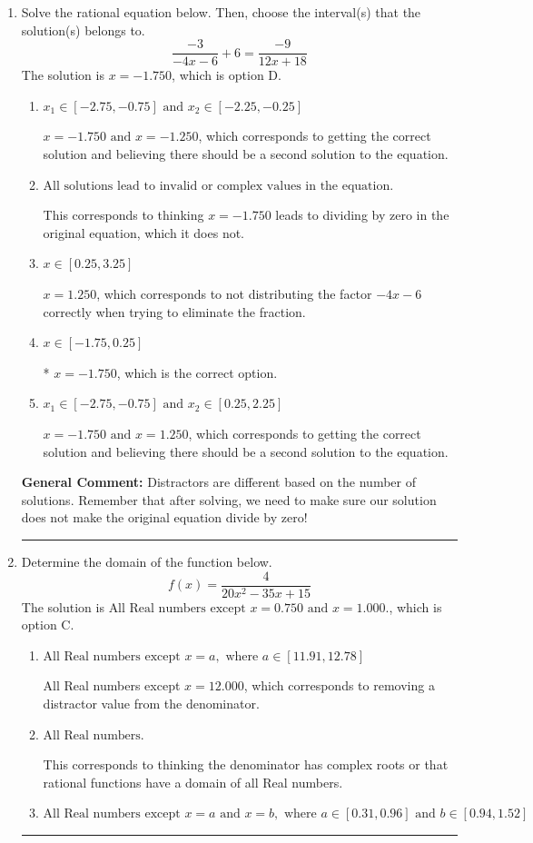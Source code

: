 \documentclass{extbook}[14pt]
\newcommand{\litem}[1]{\item #1

\rule{\textwidth}{0.4pt}}
\begin{document}
\begin{enumerate}\litem{
Solve the rational equation below. Then, choose the interval(s) that the solution(s) belongs to.
\[ \frac{-3}{-4x -6} + 6 = \frac{-9}{12x + 18} \]The solution is \( x = -1.750 \), which is option D.\begin{enumerate}[label=\Alph*.]
\item \( x_1 \in [-2.75, -0.75] \text{ and } x_2 \in [-2.25,-0.25] \)

$x = -1.750 \text{ and } x = -1.250$, which corresponds to getting the correct solution and believing there should be a second solution to the equation.
\item \( \text{All solutions lead to invalid or complex values in the equation.} \)

This corresponds to thinking $x = -1.750$ leads to dividing by zero in the original equation, which it does not.
\item \( x \in [0.25,3.25] \)

$x = 1.250$, which corresponds to not distributing the factor $-4x -6$ correctly when trying to eliminate the fraction.
\item \( x \in [-1.75,0.25] \)

* $x = -1.750$, which is the correct option.
\item \( x_1 \in [-2.75, -0.75] \text{ and } x_2 \in [0.25,2.25] \)

$x = -1.750 \text{ and } x = 1.250$, which corresponds to getting the correct solution and believing there should be a second solution to the equation.
\end{enumerate}

\textbf{General Comment:} Distractors are different based on the number of solutions. Remember that after solving, we need to make sure our solution does not make the original equation divide by zero!
}
\litem{
Determine the domain of the function below.
\[ f(x) = \frac{4}{20x^{2} -35 x + 15} \]The solution is \( \text{All Real numbers except } x = 0.750 \text{ and } x = 1.000. \), which is option C.\begin{enumerate}[label=\Alph*.]
\item \( \text{All Real numbers except } x = a, \text{ where } a \in [11.91, 12.78] \)

All Real numbers except $x = 12.000$, which corresponds to removing a distractor value from the denominator.
\item \( \text{All Real numbers.} \)

This corresponds to thinking the denominator has complex roots or that rational functions have a domain of all Real numbers.
\item \( \text{All Real numbers except } x = a \text{ and } x = b, \text{ where } a \in [0.31, 0.96] \text{ and } b \in [0.94, 1.52] \)


\end{enumerate}}
\end{enumerate}
\end{document}
